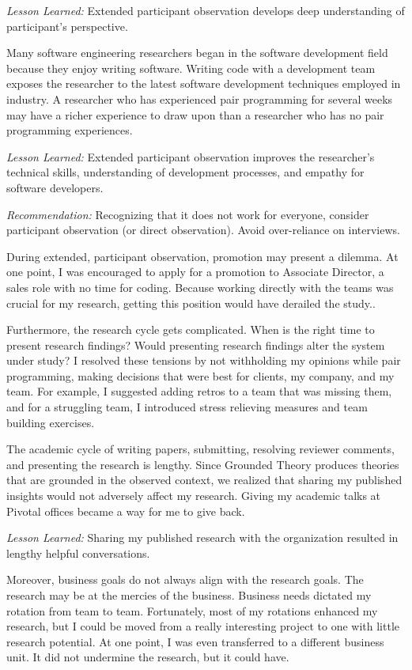 \textit{Lesson Learned:} Extended participant observation develops deep understanding of participant's perspective.

Many software engineering researchers began in the software development field because they enjoy writing software. Writing code with a development team exposes the researcher to the latest software development techniques employed in industry. A researcher who has experienced pair programming for several weeks may have a richer experience to draw upon than a researcher who has no pair programming experiences.

\textit{Lesson Learned:} Extended participant observation improves the researcher's technical skills, understanding of development processes, and empathy for software developers.

\textit{Recommendation:} Recognizing that it does not work for everyone, consider participant observation (or direct observation). Avoid over-reliance on interviews.

During extended, participant observation, promotion may present a dilemma. At one point, I was encouraged to apply for a promotion to Associate Director, a sales role with no time for coding. Because working directly with the teams was crucial for my research, getting this position would have derailed the study.. 

Furthermore, the research cycle gets complicated. When is the right time to present research findings? Would presenting research findings alter the system under study? I resolved these tensions by not withholding my opinions while pair programming, making decisions that were best for clients, my company, and my team. For example, I suggested adding retros to a team that was missing them, and for a struggling team, I introduced stress relieving measures and team building exercises.

The academic cycle of writing papers, submitting, resolving reviewer comments, and presenting the research is lengthy. Since Grounded Theory produces theories that are grounded in the observed context, we realized that sharing my published insights would not adversely affect my research. Giving my academic talks at Pivotal offices became a way for me to give back. 

\textit{Lesson Learned:} Sharing my published research with the organization resulted in lengthy helpful conversations. 

Moreover, business goals do not always align with the research goals. The research may be at the mercies of the business. Business needs dictated my rotation from team to team. Fortunately, most of my rotations enhanced my research, but I could be moved from a really interesting project to one with little research potential. At one point, I was even transferred to a different business unit. It did not undermine the research, but it could have. 

